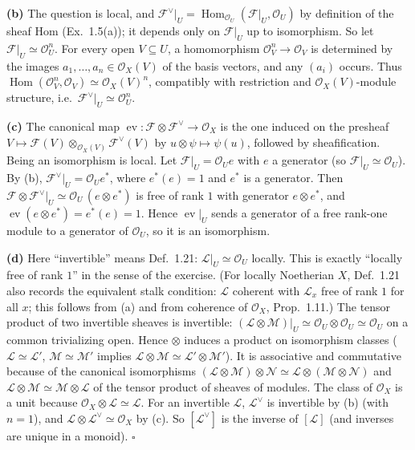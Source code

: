 \documentclass[11pt]{article}
\begin{document}
\textbf{(b)} The question is local, and $\mathcal F^\vee|_U=\operatorname{Hom}_{\mathcal O_U}(\mathcal F|_U,\mathcal O_U)$ by definition of the sheaf Hom (Ex.~1.5(a)); it depends only on $\mathcal F|_U$ up to isomorphism. So let $\mathcal F|_U\simeq\mathcal O_U^n$. For every open $V\subseteq U$, a homomorphism $\mathcal O_V^n\to\mathcal O_V$ is determined by the images $a_1,\dots,a_n\in\mathcal O_X(V)$ of the basis vectors, and any $(a_i)$ occurs. Thus $\operatorname{Hom}(\mathcal O_V^n,\mathcal O_V)\simeq\mathcal O_X(V)^n$, compatibly with restriction and $\mathcal O_X(V)$-module structure, i.e.\ $\mathcal F^\vee|_U\simeq\mathcal O_U^n$.

\textbf{(c)} The canonical map $\operatorname{ev}:\mathcal F\otimes\mathcal F^\vee\to\mathcal O_X$ is the one induced on the presheaf $V\mapsto\mathcal F(V)\otimes_{\mathcal O_X(V)}\mathcal F^\vee(V)$ by $u\otimes\psi\mapsto\psi(u)$, followed by sheafification. Being an isomorphism is local. Let $\mathcal F|_U=\mathcal O_Ue$ with $e$ a generator (so $\mathcal F|_U\simeq\mathcal O_U$). By (b), $\mathcal F^\vee|_U=\mathcal O_Ue^*$, where $e^*(e)=1$ and $e^*$ is a generator. Then $\mathcal F\otimes\mathcal F^\vee|_U\simeq\mathcal O_U\,(e\otimes e^*)$ is free of rank $1$ with generator $e\otimes e^*$, and $\operatorname{ev}(e\otimes e^*)=e^*(e)=1$. Hence $\operatorname{ev}|_U$ sends a generator of a free rank-one module to a generator of $\mathcal O_U$, so it is an isomorphism.

\textbf{(d)} Here ``invertible'' means Def.~1.21: $\mathcal L|_U\simeq\mathcal O_U$ locally. This is exactly ``locally free of rank $1$'' in the sense of the exercise. (For locally Noetherian $X$, Def.~1.21 also records the equivalent stalk condition: $\mathcal L$ coherent with $\mathcal L_x$ free of rank $1$ for all $x$; this follows from (a) and from coherence of $\mathcal O_X$, Prop.~1.11.) The tensor product of two invertible sheaves is invertible: $(\mathcal L\otimes\mathcal M)|_U\simeq\mathcal O_U\otimes\mathcal O_U\simeq\mathcal O_U$ on a common trivializing open. Hence $\otimes$ induces a product on isomorphism classes ($\mathcal L\simeq\mathcal L'$, $\mathcal M\simeq\mathcal M'$ implies $\mathcal L\otimes\mathcal M\simeq\mathcal L'\otimes\mathcal M'$). It is associative and commutative because of the canonical isomorphisms $(\mathcal L\otimes\mathcal M)\otimes\mathcal N\simeq\mathcal L\otimes(\mathcal M\otimes\mathcal N)$ and $\mathcal L\otimes\mathcal M\simeq\mathcal M\otimes\mathcal L$ of the tensor product of sheaves of modules. The class of $\mathcal O_X$ is a unit because $\mathcal O_X\otimes\mathcal L\simeq\mathcal L$. For an invertible $\mathcal L$, $\mathcal L^\vee$ is invertible by (b) (with $n=1$), and $\mathcal L\otimes\mathcal L^\vee\simeq\mathcal O_X$ by (c). So $[\mathcal L^\vee]$ is the inverse of $[\mathcal L]$ (and inverses are unique in a monoid). \hfill$\square$
\end{document}
